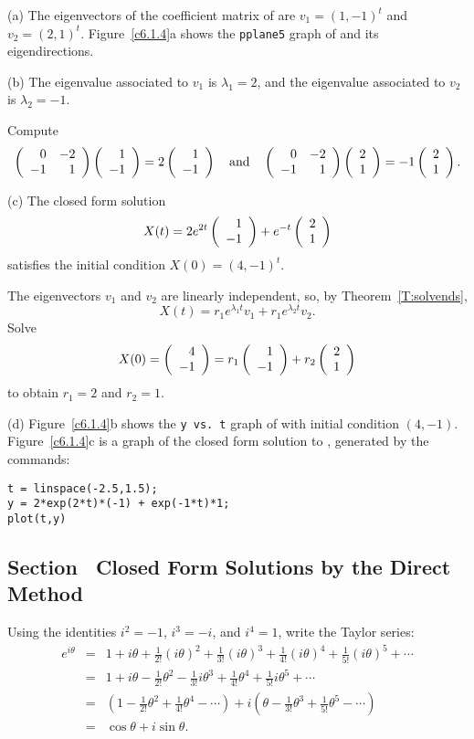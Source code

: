 (a) The eigenvectors of the coefficient matrix of  are
$v_1 = (1,-1)^t$ and $v_2 = (2,1)^t$.  Figure~\ref{c6.1.4}a shows
the {\tt pplane5} graph of  and its eigendirections.

(b) \ans The eigenvalue associated to $v_1$ is $\lambda_1 = 2$, and
the eigenvalue associated to $v_2$ is $\lambda_2 = -1$. 

\soln Compute
\[ \left(\begin{array}{rr} 0 & -2\\ -1 &1\end{array}\right)\left(\begin{array}{r} 1 \\ -1\end{array}\right) = 2\left(\begin{array}{r} 1 \\ -1\end{array}\right) \quad\mbox{and}\quad
\left(\begin{array}{rr} 0 & -2\\ -1 &1\end{array}\right)\left(\begin{array}{r} 2 \\ 1\end{array}\right) =  -1\left(\begin{array}{r} 2 \\ 1\end{array}\right). \]

(c) \ans The closed form solution
\[
X(t) = 2e^{2t}\left(\begin{array}{r} 1 \\ -1\end{array}\right) + e^{-t}\left(\begin{array}{r} 2 \\ 1\end{array}\right)
\]
satisfies the initial condition $X(0) = (4,-1)^t$.

\soln The eigenvectors $v_1$ and $v_2$ are linearly independent, so, by 
Theorem~\ref{T:solvends},
\[
X(t) = r_1e^{\lambda_1t}v_1 + r_1e^{\lambda_2t}v_2.
\]
Solve
\[
X(0) = \left(\begin{array}{r} 4 \\ -1\end{array}\right) = r_1\left(\begin{array}{r} 1 \\ -1\end{array}\right) + r_2\left(\begin{array}{r} 2 \\ 1\end{array}\right)
\]
to obtain $r_1 = 2$ and $r_2 = 1$.

(d) Figure~\ref{c6.1.4}b shows the {\tt y vs.\ t} graph of 
with initial condition $(4,-1)$.  Figure~\ref{c6.1.4}c is a graph of 
the closed form solution to , generated by the \Matlab
commands:
\begin{verbatim}
t = linspace(-2.5,1.5);
y = 2*exp(2*t)*(-1) + exp(-1*t)*1;
plot(t,y)
\end{verbatim}

\begin{figure}[htb]
                       \centerline{%
                       }
\end{figure}



\subsection*{Section~\protect{\ref{S:TDM}} Closed Form Solutions by the Direct
Method}

Using the identities $i^2 = -1$, $i^3 = -i$, and $i^4 = 1$, write
the Taylor series:
\[
\begin{array}{rcl}
e^{i\theta} & = & 1 + i\theta + \frac{1}{2!}(i\theta)^2 +
\frac{1}{3!}(i\theta)^3 + \frac{1}{4!}(i\theta)^4 +
\frac{1}{5!}(i\theta)^5 + \cdots \\
& = & 1 + i\theta - \frac{1}{2!}\theta^2 - \frac{1}{3!}i\theta^3 +
\frac{1}{4!}\theta^4 + \frac{1}{5!}i\theta^5 + \cdots \\
& = & (1 - \frac{1}{2!}\theta^2 + \frac{1}{4!}\theta^4 - \cdots)
+ i(\theta - \frac{1}{3!}\theta^3 + \frac{1}{5!}\theta^5 - \cdots) \\
& = & \cos\theta + i\sin\theta. \end{array}
\]


